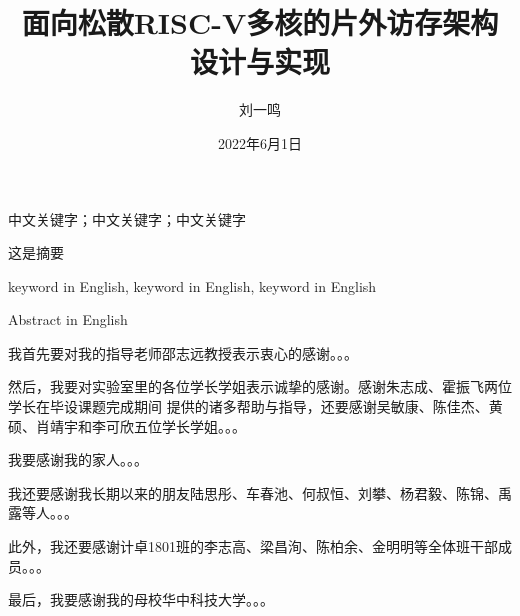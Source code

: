 \documentclass[supercite,gbt15cite,notofont]{HustGraduPaper}
\title{面向松散RISC-V多核的片外访存架构设计与实现}
\author{刘一鸣}
\date{2022年6月1日}
\begin{document}
\maketitle

\statement

\clearpage


\begin{cnabstract}{中文关键字；中文关键字；中文关键字}


这是摘要

\end{cnabstract}

\begin{enabstract}{keyword in English, keyword in English, keyword in English}


Abstract in English

\end{enabstract}

\tableofcontents[level=2]

\clearpage









\begin{thankpage}


我首先要对我的指导老师邵志远教授表示衷心的感谢。。。

然后，我要对实验室里的各位学长学姐表示诚挚的感谢。感谢朱志成、霍振飞两位学长在毕设课题完成期间
提供的诸多帮助与指导，还要感谢吴敏康、陈佳杰、黄硕、肖靖宇和李可欣五位学长学姐。。。

我要感谢我的家人。。。

我还要感谢我长期以来的朋友陆思彤、车春池、何叔恒、刘攀、杨君毅、陈锦、禹露等人。。。

此外，我还要感谢计卓1801班的李志高、梁昌洵、陈柏余、金明明等全体班干部成员。。。

最后，我要感谢我的母校华中科技大学。。。


\end{thankpage}


\end{document}
